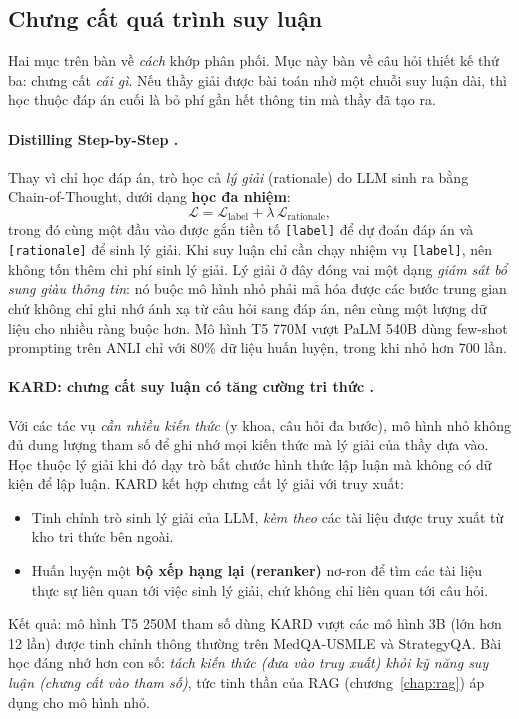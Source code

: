\subsection{Chưng cất quá trình suy luận}
\label{ssec:rationale_distillation}

Hai mục trên bàn về \emph{cách} khớp phân phối. Mục này bàn về câu hỏi thiết kế thứ ba: chưng cất \emph{cái gì}. Nếu thầy giải được bài toán nhờ một chuỗi suy luận dài, thì học thuộc đáp án cuối là bỏ phí gần hết thông tin mà thầy đã tạo ra.

\paragraph{Distilling Step-by-Step \cite{hsieh2023distilling}.} Thay vì chỉ học đáp án, trò học cả \emph{lý giải} (rationale) do LLM sinh ra bằng Chain-of-Thought, dưới dạng \textbf{học đa nhiệm}:
\[
\mathcal{L} = \mathcal{L}_{\text{label}} + \lambda\, \mathcal{L}_{\text{rationale}},
\]
trong đó cùng một đầu vào được gắn tiền tố \texttt{[label]} để dự đoán đáp án và \texttt{[rationale]} để sinh lý giải. Khi suy luận chỉ cần chạy nhiệm vụ \texttt{[label]}, nên không tốn thêm chi phí sinh lý giải. Lý giải ở đây đóng vai một dạng \emph{giám sát bổ sung giàu thông tin}: nó buộc mô hình nhỏ phải mã hóa được các bước trung gian chứ không chỉ ghi nhớ ánh xạ từ câu hỏi sang đáp án, nên cùng một lượng dữ liệu cho nhiều ràng buộc hơn. Mô hình T5 770M vượt PaLM 540B dùng few-shot prompting trên ANLI chỉ với 80\% dữ liệu huấn luyện, trong khi nhỏ hơn 700 lần.

\paragraph{KARD: chưng cất suy luận có tăng cường tri thức \cite{kang2023kard}.} Với các tác vụ \emph{cần nhiều kiến thức} (y khoa, câu hỏi đa bước), mô hình nhỏ không đủ dung lượng tham số để ghi nhớ mọi kiến thức mà lý giải của thầy dựa vào. Học thuộc lý giải khi đó dạy trò bắt chước hình thức lập luận mà không có dữ kiện để lập luận. KARD kết hợp chưng cất lý giải với truy xuất:
\begin{itemize}
	\item Tinh chỉnh trò sinh lý giải của LLM, \emph{kèm theo} các tài liệu được truy xuất từ kho tri thức bên ngoài.
	\item Huấn luyện một \textbf{bộ xếp hạng lại (reranker)} nơ-ron để tìm các tài liệu thực sự liên quan tới việc sinh lý giải, chứ không chỉ liên quan tới câu hỏi.
\end{itemize}
Kết quả: mô hình T5 250M tham số dùng KARD vượt các mô hình 3B (lớn hơn 12 lần) được tinh chỉnh thông thường trên MedQA-USMLE và StrategyQA. Bài học đáng nhớ hơn con số: \emph{tách kiến thức (đưa vào truy xuất) khỏi kỹ năng suy luận (chưng cất vào tham số)}, tức tinh thần của RAG (chương~\ref{chap:rag}) áp dụng cho mô hình nhỏ.


